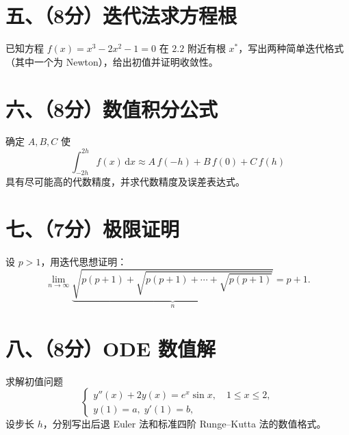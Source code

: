 \documentclass[12pt,a4paper]{article}
\begin{document}
	\section*{五、（8分）迭代法求方程根}
	已知方程 $f(x)=x^3-2x^2-1=0$ 在 $2.2$ 附近有根 $x^*$，写出两种简单迭代格式（其中一个为 Newton），给出初值并证明收敛性。
	
	\section*{六、（8分）数值积分公式}
	确定 $A,B,C$ 使
	\[
	\int_{-2h}^{2h} f(x)\,\mathrm{d}x
	\approx A\,f(-h) + B\,f(0) + C\,f(h)
	\]
	具有尽可能高的代数精度，并求代数精度及误差表达式。
	
	\section*{七、（7分）极限证明}
	设 $p>1$，用迭代思想证明：
	\[
	\lim_{n\to\infty}
	\underbrace{\sqrt{p(p+1)+\sqrt{p(p+1)+\cdots+\sqrt{p(p+1)}}}}
	_{n}
	= p+1.
	\]
	
	\section*{八、（8分）ODE 数值解}
	求解初值问题
	\[
	\begin{cases}
		y''(x) + 2y(x) = e^x\sin x,\quad 1\le x\le2,\\
		y(1)=a,\;y'(1)=b,
	\end{cases}
	\]
	设步长 $h$，分别写出后退 Euler 法和标准四阶 Runge--Kutta 法的数值格式。
	
\end{document}
